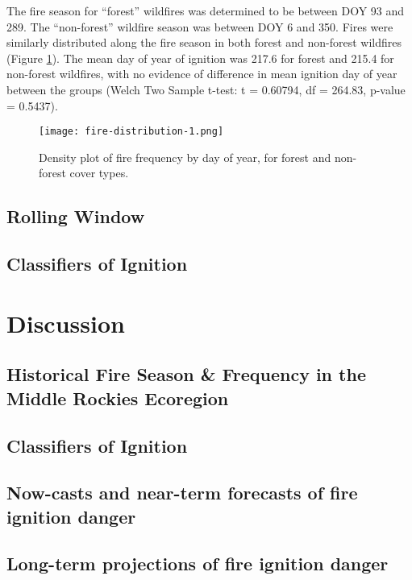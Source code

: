 \documentclass{article}
\begin{document}
The fire season for ``forest'' wildfires was determined to be between DOY 93 and 289.  The ``non-forest'' wildfire season was between DOY 6 and 350.  Fires were similarly distributed along the fire season in both forest and non-forest wildfires (Figure \ref{fig:fire-dens}). The mean day of year of ignition was 217.6 for forest and 215.4 for non-forest wildfires, with no evidence of difference in mean ignition day of year between the groups (Welch Two Sample t-test: t = 0.60794, df = 264.83, p-value = 0.5437).

\begin{figure}[ht]
  \texttt{[image: fire-distribution-1.png]}
  \caption{Density plot of fire frequency by day of year, for forest and non-forest cover types.}
  \label{fig:fire-dens}
\end{figure}



\subsection{Rolling Window}
\subsection{Classifiers of Ignition}

\section{Discussion}
\subsection{Historical Fire Season \& Frequency in the Middle Rockies Ecoregion}
\subsection{Classifiers of Ignition}
\subsection{Now-casts and near-term forecasts of fire ignition danger}
\subsection{Long-term projections of fire ignition danger}

\printbibliography[
heading=bibintoc,
title={Bibliography}
]
\end{document}
